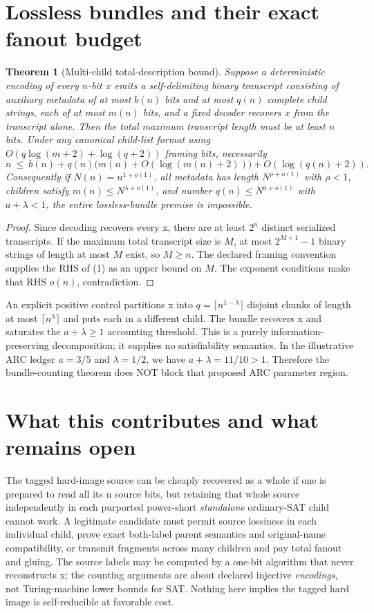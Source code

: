 \documentclass[11pt]{article}
\newtheorem{theorem}{Theorem}
\begin{document}
\section{Lossless bundles and their exact fanout budget}
\begin{theorem}[Multi-child total-description bound]
Suppose a deterministic encoding of every $n$-bit $x$ emits
a self-delimiting binary transcript consisting of auxiliary
metadata of at most $b(n)$ bits and at most $q(n)$ complete
child strings, each of at most $m(n)$ bits, and a fixed
decoder recovers $x$ from the transcript alone. Then the
\emph{total maximum transcript length} must be at least
$n$ bits. Under any canonical child-list format using
$O(q\log(m+2)+\log(q+2))$ framing bits, necessarily
\[
 n\ \le\
 b(n)+q(n)\bigl(m(n)+O(\log(m(n)+2))\bigr)
 +O(\log(q(n)+2)).
\tag{1}
\]
Consequently if $N(n)=n^{1+o(1)}$, all metadata has
length $N^{\rho+o(1)}$ with $\rho<1$, children satisfy
$m(n)\le N^{\lambda+o(1)}$, and number
$q(n)\le N^{a+o(1)}$ with $a+\lambda<1$, the entire
lossless-bundle premise is impossible.
\end{theorem}
\begin{proof}
Since decoding recovers every x, there are at least $2^n$
distinct serialized transcripts. If the maximum
total transcript size is $M$, at most $2^{M+1}-1$
binary strings of length at most $M$ exist, so $M\ge n$.
The declared framing convention supplies the RHS of (1)
as an upper bound on $M$. The exponent conditions make
that RHS $o(n)$, contradiction.
\end{proof}
An explicit positive control partitions x into
$q=\lceil n^{1-\lambda}\rceil$ disjoint chunks of length
at most $\lceil n^\lambda\rceil$ and puts each in a
different child. The bundle recovers x and saturates
the $a+\lambda\ge1$ accounting threshold.
This is a purely information-preserving decomposition;
it supplies no satisfiability semantics. In the
illustrative ARC ledger $a=3/5$ and $\lambda=1/2$,
we have $a+\lambda=11/10>1$.
Therefore the bundle-counting theorem does NOT block
that proposed ARC parameter region.

\section{What this contributes and what remains open}
The tagged hard-image source can be cheaply recovered as
a whole if one is prepared to read all its n source
bits, but retaining that whole source independently in
each purported power-short \emph{standalone}
ordinary-SAT child cannot work. A legitimate candidate
must permit source lossiness in each individual child,
prove exact both-label parent semantics and original-name
compatibility, or transmit fragments across many
children and pay total fanout and gluing.
The source labels may be computed by a one-bit
algorithm that never reconstructs x; the counting
arguments are about declared injective \emph{encodings},
not Turing-machine lower bounds for SAT.
Nothing here implies the tagged hard image is
self-reducible at favorable cost.
\end{document}

